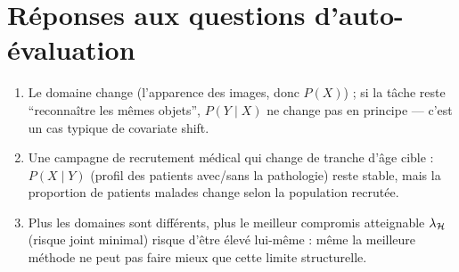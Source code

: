 \documentclass[11pt]{article}
\begin{document}
\appendix
\section{Réponses aux questions d'auto-évaluation}
\label{app:answers}
\begin{enumerate}
\item[Q1.1] Le domaine change (l'apparence des images, donc $P(X)$) ; si la tâche reste
\enquote{reconnaître les mêmes objets}, $P(Y\mid X)$ ne change pas en principe --- c'est un cas typique
de covariate shift.
\item[Q1.2] Une campagne de recrutement médical qui change de tranche d'âge cible : $P(X\mid Y)$ (profil
des patients avec/sans la pathologie) reste stable, mais la proportion de patients malades change selon
la population recrutée.
\item[Q1.3] Plus les domaines sont différents, plus le meilleur compromis atteignable $\lambda_{\mathcal{H}}$
(risque joint minimal) risque d'être élevé lui-même : même la meilleure méthode ne peut pas faire mieux
que cette limite structurelle.
\end{enumerate}
\end{document}
